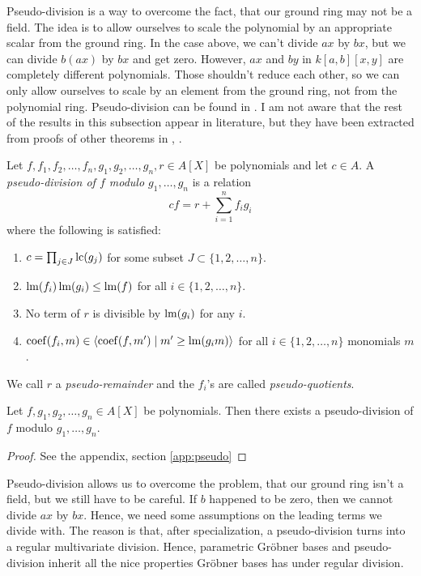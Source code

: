 Pseudo-division is a way to overcome the fact, that our ground ring may not be a field. The idea is to allow ourselves to scale the polynomial by an appropriate scalar from the ground ring. In the case above, we can't divide $ax$ by $bx$, but we can divide $b(ax)$ by $bx$ and get zero. However, $ax$ and $by$ in $k[a, b][x, y]$ are completely different polynomials. Those shouldn't reduce each other, so we can only allow ourselves to scale by an element from the ground ring, not from the polynomial ring. Pseudo-division can be found in \cite{IVA}. I am not aware that the rest of the results in this subsection appear in literature, but they have been extracted from proofs of other theorems in \cite{grb_covers}, \cite{MONTES20101391}.

\begin{definition}
  Let $f, f_{1}, f_{2}, \dots, f_{n}, g_{1}, g_{2}, \dots, g_{n}, r \in A[X]$ be polynomials and let $c \in A$. A \textit{pseudo-division of $f$ modulo $g_{1}, \dots, g_{n}$} is a relation
  \[cf = r + \sum_{i=1}^{n} f_{i}g_{i}\]
  where the following is satisfied:
  \begin{enumerate}
    \item $c = \prod_{j\in J} \operatorname{lc}(g_{j})$ for some subset $J \subset \{1, 2, \dots, n\}$.
    \item $\operatorname{lm}(f_{i})\operatorname{lm}(g_{i}) \leq \operatorname{lm}(f)$ for all $i \in \{1, 2, \dots, n\}$.
    \item No term of $r$ is divisible by $\operatorname{lm}(g_{i})$ for any $i$.
    \item $\operatorname{coef}(f_{i}, m) \in \langle \operatorname{coef}(f, m') \mid m' \geq \operatorname{lm}(g_{i}m) \rangle$ for all $i \in \{1, 2, \dots, n\}$ monomials $m$.
  \end{enumerate}
  We call $r$ a \textit{pseudo-remainder} and the $f_{i}$'s are called \textit{pseudo-quotients}.
\end{definition}


\begin{theorem}\label{thm:exi_pseudo}
  Let $f, g_{1}, g_{2}, \dots, g_{n} \in A[X]$ be polynomials. Then there exists a pseudo-division of $f$ modulo $g_{1}, \dots, g_{n}$.
\end{theorem}
\begin{proof}
  See the appendix, section \ref{app:pseudo}
\end{proof}

Pseudo-division allows us to overcome the problem, that our ground ring isn't a field, but we still have to be careful. If $b$ happened to be zero, then we cannot divide $ax$ by $bx$. Hence, we need some assumptions on the leading terms we divide with. The reason is that, after specialization, a pseudo-division turns into a regular multivariate division. Hence, parametric Gröbner bases and pseudo-division inherit all the nice properties Gröbner bases has under regular division.

